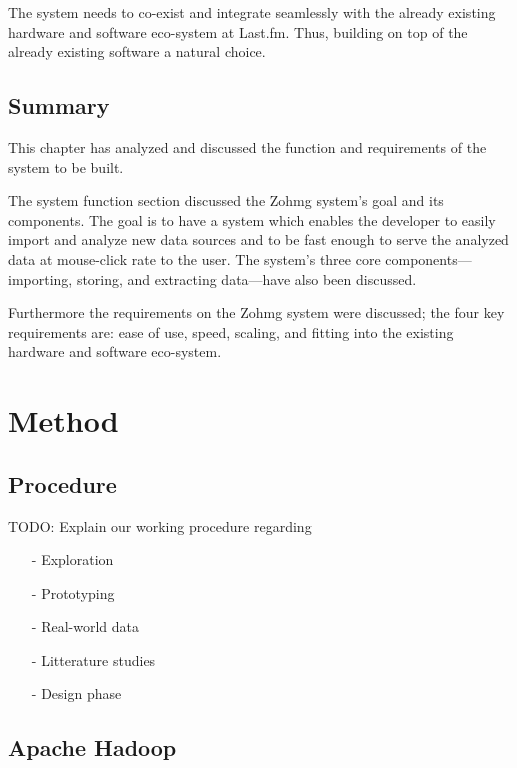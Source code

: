 The system needs to co-exist and integrate seamlessly with the already existing
hardware and software eco-system at Last.fm. Thus, building on top of the
already existing software a natural choice.


\section*{Summary}

This chapter has analyzed and discussed the function and requirements of the
system to be built.

The system function section discussed the Zohmg system's goal and its
components. The goal is to have a system which enables the developer to easily
import and analyze new data sources and to be fast enough to serve the analyzed
data at mouse-click rate to the user. The system's three core
components---importing, storing, and extracting data---have also been
discussed.

Furthermore the requirements on the Zohmg system were discussed; the four key
requirements are: ease of use, speed, scaling, and fitting into the existing
hardware and software eco-system.



\chapter{Method}



\section{Procedure}

TODO: Explain our working procedure regarding

\begin{itemize}
\item[-] Exploration
\item[-] Prototyping
\item[-] Real-world data
\item[-] Litterature studies
\item[-] Design phase
\end{itemize}



\section{Apache Hadoop}

